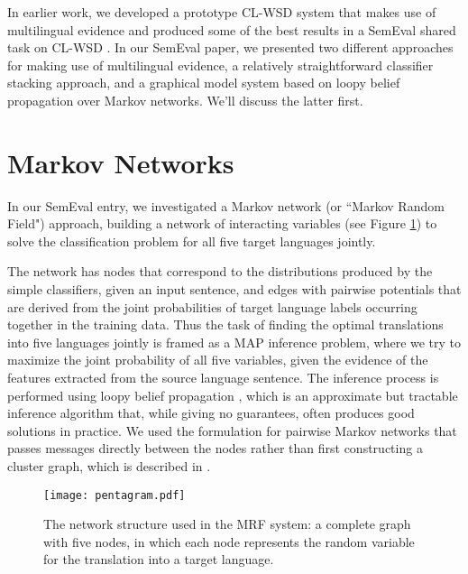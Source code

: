 In earlier work, we developed a prototype CL-WSD system that makes use of
multilingual evidence \cite{rudnick-liu-gasser:2013:SemEval-2013} and produced
some of the best results in a SemEval shared task on CL-WSD \cite{task10}.
In our SemEval paper, we presented two different approaches for making use of
multilingual evidence, a relatively straightforward classifier stacking
approach, and a graphical model system based on loopy belief propagation over
Markov networks. We'll discuss the latter first.

\section{Markov Networks}
In our SemEval entry, we investigated a Markov network (or ``Markov Random
Field") approach, building a network of interacting variables (see Figure
\ref{fig:pentagram}) to solve the classification problem for all five target
languages jointly.

The network has nodes that correspond to the distributions produced by the
simple classifiers, given an input sentence, and edges with pairwise potentials
that are derived from the joint probabilities of target language labels
occurring together in the training data. 
Thus the task of finding the optimal translations into five languages jointly
is framed as a MAP inference problem, where we try to maximize the joint
probability of all five variables, given the evidence of the features extracted
from the source language sentence.
The inference process is performed using loopy belief propagation
\cite{DBLP:conf/uai/MurphyWJ99}, which is an approximate but tractable
inference algorithm that, while giving no guarantees, often produces good
solutions in practice.
We used the formulation for pairwise Markov networks that passes messages
directly between the nodes rather than first constructing a cluster graph,
which is described in \cite[\S 11.3.5.1]{Koller+Friedman:09}.

\begin{figure}
  \begin{center}
  \texttt{[image: pentagram.pdf]}
  \end{center}
  \caption{The network structure used in the MRF system: a complete graph with
  five nodes, in which each node represents the random variable for the
  translation into a target language.}
  \label{fig:pentagram}
\end{figure}


